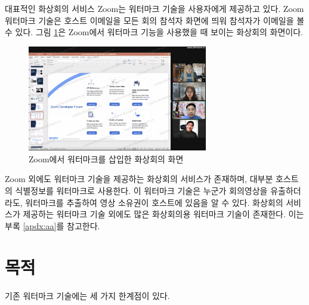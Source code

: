 대표적인 화상회의 서비스 Zoom는 워터마크 기술을 사용자에게 제공하고 있다. Zoom
워터마크 기술은 호스트 이메일을 모든 회의 참석자 화면에 띄워 참석자가 이메일을 볼 수
있다. 그림 \ref{fig:zoom_wm}은 Zoom에서 워터마크 기능을 사용했을 때 보이는
화상회의 화면이다.
\begin{figure}[ht]
    \vspace{10pt}
    \centering
    \includegraphics[width=0.7\textwidth]{imgs/zoom_wm.png}
    \caption{Zoom에서 워터마크를 삽입한 화상회의 화면}
    \label{fig:zoom_wm}
\end{figure}
Zoom 외에도 워터마크 기술을 제공하는 화상회의 서비스가 존재하며, 대부분 호스트의
식별정보를 워터마크로 사용한다. 이 워터마크 기술은 누군가 회의영상을
유출하더라도, 워터마크를 추출하여 영상 소유권이 호스트에 있음을 알 수 있다.
화상회의 서비스가 제공하는 워터마크 기술 외에도 많은 화상회의용 워터마크 기술이
존재한다. 이는 부록 \ref{apdx:aa}를 참고한다.

\section{목적}

기존 워터마크 기술에는 세 가지 한계점이 있다.

